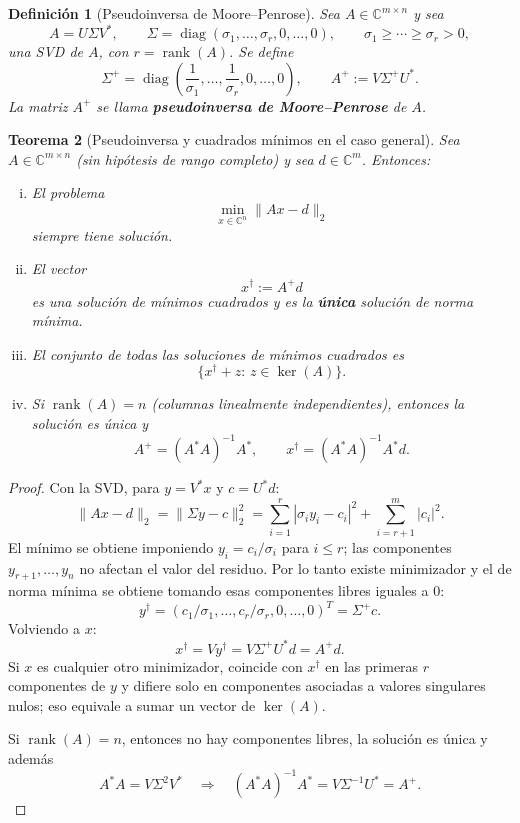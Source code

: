 \documentclass[a4paper,11pt]{report}
\newtheorem{theorem}{Teorema}[chapter]
\newtheorem{definition}[theorem]{Definición}
\begin{document}
\begin{definition}[Pseudoinversa de Moore--Penrose]
Sea $A\in\mathbb{C}^{m\times n}$ y sea
\[
A=U\Sigma V^*,\qquad
\Sigma=\operatorname{diag}(\sigma_1,\ldots,\sigma_r,0,\ldots,0),\qquad
\sigma_1\ge\cdots\ge\sigma_r>0,
\]
una SVD de $A$, con $r=\operatorname{rank}(A)$. Se define
\[
\Sigma^+=\operatorname{diag}\!\left(\frac1{\sigma_1},\ldots,\frac1{\sigma_r},0,\ldots,0\right),
\qquad
A^+:=V\Sigma^+U^*.
\]
La matriz $A^+$ se llama \textbf{pseudoinversa de Moore--Penrose} de $A$.
\end{definition}

\begin{theorem}[Pseudoinversa y cuadrados mínimos en el caso general]
Sea $A\in\mathbb{C}^{m\times n}$ (sin hipótesis de rango completo) y sea $d\in\mathbb{C}^m$. Entonces:
\begin{enumerate}[(i)]
\item El problema
\[
\min_{x\in\mathbb{C}^n}\|Ax-d\|_2
\]
siempre tiene solución.
\item El vector
\[
x^\dagger:=A^+d
\]
es una solución de mínimos cuadrados y es la \textbf{única} solución de norma mínima.
\item El conjunto de todas las soluciones de mínimos cuadrados es
\[
\{x^\dagger+z:\, z\in\ker(A)\}.
\]
\item Si $\operatorname{rank}(A)=n$ (columnas linealmente independientes), entonces la solución es única y
\[
A^+=(A^*A)^{-1}A^*,
\qquad
x^\dagger=(A^*A)^{-1}A^*d.
\]
\end{enumerate}
\end{theorem}

\begin{proof}
Con la SVD, para $y=V^*x$ y $c=U^*d$:
\[
\|Ax-d\|_2=\|\Sigma y-c\|_2^2
=\sum_{i=1}^r|\sigma_i y_i-c_i|^2+\sum_{i=r+1}^{m}|c_i|^2.
\]
El mínimo se obtiene imponiendo $y_i=c_i/\sigma_i$ para $i\le r$; las componentes $y_{r+1},\ldots,y_n$ no afectan el valor del residuo. Por lo tanto existe minimizador y el de norma mínima se obtiene tomando esas componentes libres iguales a $0$:
\[
y^\dagger=(c_1/\sigma_1,\ldots,c_r/\sigma_r,0,\ldots,0)^T=\Sigma^+c.
\]
Volviendo a $x$:
\[
x^\dagger=Vy^\dagger=V\Sigma^+U^*d=A^+d.
\]
Si $x$ es cualquier otro minimizador, coincide con $x^\dagger$ en las primeras $r$ componentes de $y$ y difiere solo en componentes asociadas a valores singulares nulos; eso equivale a sumar un vector de $\ker(A)$.

Si $\operatorname{rank}(A)=n$, entonces no hay componentes libres, la solución es única y además
\[
A^*A=V\Sigma^2V^*\quad\Rightarrow\quad (A^*A)^{-1}A^*=V\Sigma^{-1}U^*=A^+.
\]
\end{proof}
\end{document}
